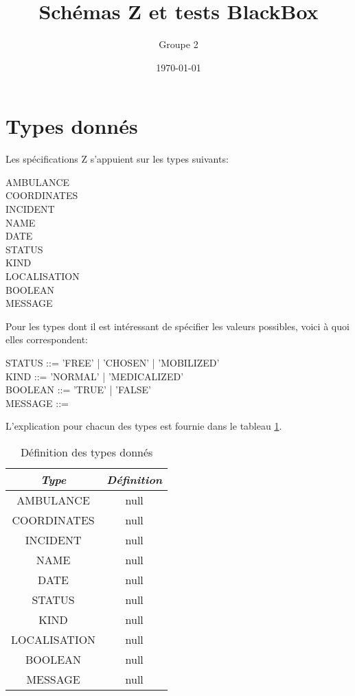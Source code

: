 \documentclass[12pt]{article}
\begin{document}
\title{Schémas Z et tests BlackBox}
\author{Groupe 2}
\date{\today}
\maketitle


\section{Types donnés}
Les spécifications Z s'appuient sur les types suivants:
\begin{zed}
AMBULANCE \\
COORDINATES \\
INCIDENT \\
NAME \\
DATE \\
STATUS  \\
KIND \\
LOCALISATION \\
BOOLEAN \\
MESSAGE  \\
\end{zed}

Pour les types dont il est intéressant de spécifier les valeurs possibles, voici à quoi elles correspondent:
\begin{syntax}
STATUS ::= 'FREE' | 'CHOSEN' | 'MOBILIZED' \\
KIND ::= 'NORMAL' | 'MEDICALIZED' \\
BOOLEAN ::= 'TRUE'  | 'FALSE' \\
MESSAGE ::= \\
\end{syntax}

L'explication pour chacun des types est fournie dans le tableau \ref{tab:typedefinition}.
\begin{table}[htdp]
\begin{center}\begin{tabular}{|c|c|}\hline 
\textit{Type} & \textit{Définition} \\\hline
AMBULANCE & null \\\hline COORDINATES & null \\\hline INCIDENT & null \\\hline NAME & null \\\hline DATE & null \\\hline STATUS & null \\\hline KIND & null \\\hline LOCALISATION & null \\\hline BOOLEAN & null \\\hline MESSAGE & null \\\hline \end{tabular} \caption{Définition des types donnés}
\end{center}
\label{tab:typedefinition}
\end{table}
\end{document}
